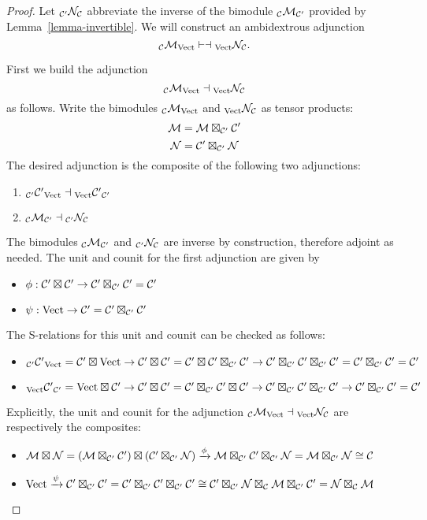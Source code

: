 \documentclass{amsart}
\begin{document}
\begin{proof}
Let $\bimod{\cC'}{\cN}{\cC}$ abbreviate the inverse  of the bimodule $\bimod{\cC}{\cM}{\cC'}$ provided by Lemma~\ref{lemma-invertible}.  We will construct an ambidextrous adjunction
$$\bimod{\cC}{\cM}{\Vect} \ambadj \bimod{\Vect}{\cN}{\cC}.$$

First we build the adjunction
$$\bimod{\cC}{\cM}{\Vect} \adj \bimod{\Vect}{\cN}{\cC}$$
as follows.  Write the bimodules $\bimod{\cC}{\cM}{\Vect}$ and $\bimod{\Vect}{\cN}{\cC}$ as tensor products:
$$\cM = \cM \dtimes_{\cC'} \cC'$$
$$\cN = \cC' \dtimes_{\cC'} \cN$$
The desired adjunction is the composite of the following two adjunctions:
\begin{enumerate}
\item $\bimod{\cC'}{\cC'}{\Vect} \adj \bimod{\Vect}{\cC'}{\cC'}$
\item $\bimod{\cC}{\cM}{\cC'} \adj \bimod{\cC'}{\cN}{\cC}$
\end{enumerate}
The bimodules $\bimod{\cC}{\cM}{\cC'}$ and $\bimod{\cC'}{\cN}{\cC}$ are inverse by construction, therefore adjoint as needed.  The unit and counit for the first adjunction are given by
\begin{itemize}
\item[] $\phi: \cC' \dtimes \cC' \ra \cC' \dtimes_{\cC'} \cC' = \cC'$
\item[] $\psi: \Vect \ra \cC' = \cC' \dtimes_{\cC'} \cC'$
\end{itemize}
The S-relations for this unit and counit can be checked as follows:
\begin{itemize}
\item[] $\bimod{\cC'}{\cC'}{\Vect} = \cC' \dtimes \Vect \ra \cC' \dtimes \cC' = \cC' \dtimes \cC' \dtimes_{\cC'} \cC' \ra \cC' \dtimes_{\cC'} \cC' \dtimes_{\cC'} \cC' = \cC' \dtimes_{\cC'} \cC' = \cC'$
\item[] $\bimod{\Vect}{\cC'}{\cC'} = \Vect \dtimes \cC' \ra \cC' \dtimes \cC' = \cC' \dtimes_{\cC'} \cC' \dtimes \cC' \ra \cC' \dtimes_{\cC'} \cC' \dtimes_{\cC'} \cC' \ra \cC' \dtimes_{\cC'} \cC' = \cC'$
\end{itemize}

Explicitly, the unit and counit for the adjunction $\bimod{\cC}{\cM}{\Vect} \adj \bimod{\Vect}{\cN}{\cC}$ are respectively the composites:
\begin{itemize}
\item[] $\cM \dtimes \cN = (\cM \dtimes_{\cC'} \cC') \dtimes (\cC' \dtimes_{\cC'} \cN) \xra{\phi} \cM \dtimes_{\cC'} \cC' \dtimes_{\cC'} \cN = \cM \dtimes_{\cC'} \cN \cong \cC$
\item[] $\Vect \xra{\psi} \cC' \dtimes_{\cC'} \cC' = \cC' \dtimes_{\cC'} \cC' \dtimes_{\cC'} \cC' \cong \cC' \dtimes_{\cC'} \cN \dtimes_{\cC} \cM \dtimes_{\cC'} \cC' = \cN \dtimes_{\cC} \cM$
\end{itemize}


\end{proof}
\end{document}
